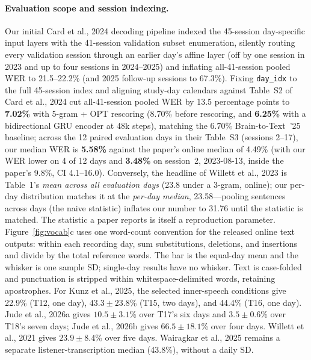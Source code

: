 \documentclass[11pt]{article}
\begin{document}
\paragraph{Evaluation scope and session indexing.} Our initial Card et al.,
2024 decoding pipeline indexed the 45-session day-specific input layers
with the 41-session validation subset enumeration, silently routing
every validation session through an earlier day's affine layer (off by
one session in 2023 and up to four sessions in 2024--2025) and inflating
all-41-session pooled WER to 21.5--22.2\% (and 2025 follow-up sessions
to 67.3\%). Fixing \texttt{day\_idx} to the full 45-session index and aligning
study-day calendars against Table~S2 of Card et al., 2024 cut all-41-session
pooled WER by 13.5 percentage points to \textbf{7.02\%} with 5-gram +
OPT rescoring (8.70\% before rescoring, and \textbf{6.25\%} with a
bidirectional GRU encoder at 48k steps), matching the 6.70\%
Brain-to-Text~'25 baseline; across the 12 paired evaluation days in
their Table~S3 (sessions 2--17), our median WER is \textbf{5.58\%} against the
paper's online median of 4.49\% (with our WER lower on 4 of 12 days and
\textbf{3.48\%} on session~2, 2023-08-13, inside the paper's 9.8\%, CI
4.1--16.0). Conversely, the headline of Willett et al., 2023 is
Table~1's \emph{mean across all evaluation days} (23.8 under a 3-gram,
online); our per-day distribution matches it at the \emph{per-day
median}, 23.58---pooling sentences across days (the naive statistic)
inflates our number to 31.76 until the statistic is matched. The
statistic a paper reports is itself a reproduction parameter. Figure~\ref{fig:vocab}c uses one word-count convention for the released
online text outputs: within each recording day, sum substitutions,
deletions, and insertions and divide by the total reference words.
The bar is the equal-day mean and the whisker is one sample SD;
single-day results have no whisker. Text is case-folded and punctuation
is stripped within whitespace-delimited words, retaining apostrophes.
For Kunz et al., 2025, the selected inner-speech conditions give 22.9\%
(T12, one day), $43.3\pm23.8$\% (T15, two days), and 44.4\%
(T16, one day). Jude et al., 2026a gives $10.5\pm3.1$\% over T17's
six days and $3.5\pm0.6$\% over T18's seven days; Jude et al., 2026b
gives $66.5\pm18.1$\% over four days. Willett et al., 2021 gives
$23.9\pm8.4$\% over five days. Wairagkar et al., 2025 remains a
separate listener-transcription median (43.8\%), without a daily SD.
\end{document}
